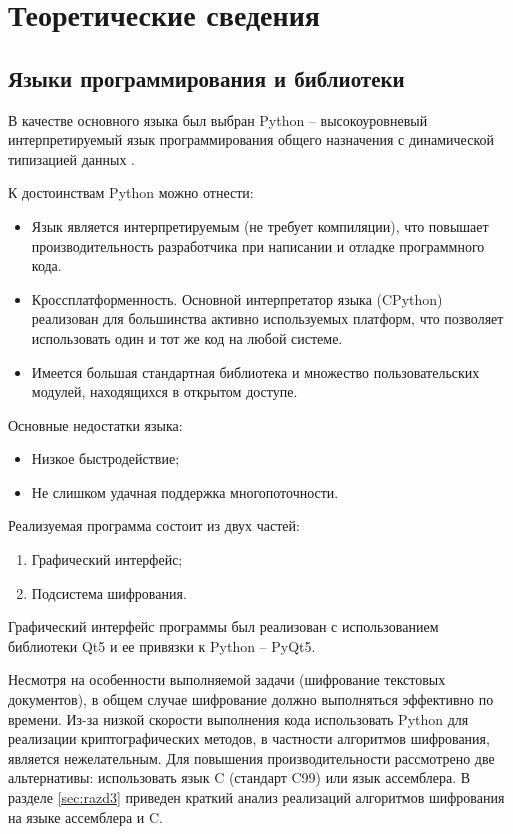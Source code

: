 \newpage
\section{Теоретические сведения}\label{sec:razd2} %

\subsection{Языки программирования и библиотеки}

В качестве основного языка был выбран Python -- высокоуровневый интерпретируемый
язык программирования общего назначения с динамической типизацией
данных \cite{python}.

К достоинствам Python можно отнести:
\begin{itemize}
    \item Язык является интерпретируемым (не требует компиляции), что повышает
    производительность разработчика при написании и отладке программного кода.
    \item Кроссплатформенность. Основной интерпретатор языка (CPython)
    реализован для большинства активно используемых платформ, что позволяет
    использовать один и тот же код на любой системе.
    \item Имеется большая стандартная библиотека и множество пользовательских
    модулей, находящихся в открытом доступе.
\end{itemize}

Основные недостатки языка:
\begin{itemize}
    \item Низкое быстродействие;
    \item Не слишком удачная поддержка многопоточности.
\end{itemize}

Реализуемая программа состоит из двух частей:
\begin{enumerate}
    \item Графический интерфейс;
    \item Подсистема шифрования.
\end{enumerate}

Графический интерфейс программы был реализован с использованием библиотеки Qt5
и ее привязки к Python -- PyQt5.

Несмотря на особенности выполняемой задачи (шифрование текстовых документов),
в общем случае шифрование должно выполняться эффективно по времени.
Из-за низкой скорости выполнения кода использовать Python для реализации криптографических
методов, в частности алгоритмов шифрования, является нежелательным.
Для повышения производительности рассмотрено две альтернативы: использовать язык C (стандарт C99) или
язык ассемблера. В разделе \ref{sec:razd3} приведен краткий анализ реализаций
алгоритмов шифрования на языке ассемблера и C.

